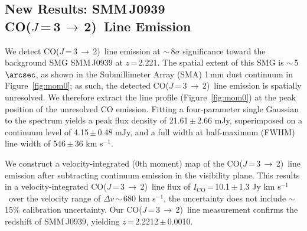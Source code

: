 \documentclass[twocolumn,apj,numberedappendix]{emulateapj}
\newcommand{\CO}{\mbox{CO($J$\,=\,3\,$\rightarrow$\,2) }}
\newcommand{\pmOne}{\mbox{$^{-1}$}}
\begin{document}
\subsection{New Results: SMM\,J0939\\ \CO Line Emission}
We detect \CO line emission at $\sim$\,8$\sigma$ significance toward the background SMG SMM\,J0939 at $z$\,=\,2.221.
The spatial extent of this SMG is $\sim$\,5$\arcsec$, as shown in the Submillimeter Array (SMA) 1\,mm dust continuum in Figure~\ref{fig:mom0}; as such, 
the detected \CO line emission is spatially unresolved. We therefore extract the line profile (Figure~\ref{fig:mom0}) at the peak position of the unresolved 
CO emission. Fitting a four-parameter single Gaussian to the spectrum yields a peak flux density of 21.61\,$\pm$\,2.66\,\,mJy, superimposed on a 
continuum level of 4.15\,$\pm$\,0.48\,\,mJy, and a full width at half-maximum (FWHM) line width of 546\,$\pm$\,36\,\,km\,\,s\pmOne.  \par
We construct a velocity-integrated (0th moment) map of the \CO line 
emission after subtracting continuum emission in the visibility plane. This results in a velocity-integrated \CO line flux of $I_\textrm{CO}$\,=\,10.1\,$\pm$\,1.3 Jy km\,\,s\pmOne\ over the velocity range of $\Delta v$\,$\sim$\,680 km\,\,s\pmOne, the uncertainty does not include $\sim$\,15\% calibration 
uncertainty. Our \CO line measurement confirms the redshift of SMM\,J0939, yielding $z$\,=\,2.2212\,$\pm$\,0.0010.
\end{document}
